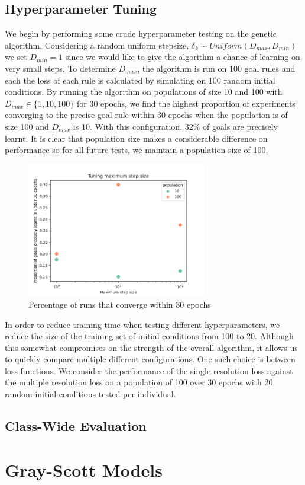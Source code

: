 \subsection{Hyperparameter Tuning}\label{sub:hyperparameter-tuning}

We begin by performing some crude hyperparameter testing on the genetic algorithm. Considering a random uniform stepsize, $\delta_k \sim \mathit{Uniform}(D_{max}, D_{min})$ we set $D_{min} = 1$ since we would like to give the algorithm a chance of learning on very small steps. To determine $D_{max}$, the algorithm is run on 100 goal rules and each the loss of each rule is calculated by simulating on 100 random initial conditions. By running the algorithm on populations of size 10 and 100 with $D_{max} \in \{1, 10, 100\}$ for 30 epochs, we find the highest proportion of experiments converging to the precise goal rule within 30 epochs when the population is of size 100 and $D_{max}$ is 10. With this configuration, 32\% of goals are precisely learnt. It is clear that population size makes a considerable difference on performance so for all future tests, we maintain a population size of 100.\\

\begin{figure}[!h]
\centering
\includegraphics[width=0.7\textwidth]{images/tune-max-step.png}
\caption{Percentage of runs that converge within 30 epochs}
\label{fig:tune-max-step}
\end{figure}

In order to reduce training time when testing different hyperparameters, we reduce the size of the training set of initial conditions from 100 to 20. Although this somewhat compromises on the strength of the overall algorithm, it allows us to quickly compare multiple different configurations. One such choice is between loss functions. We consider the performance of the single resolution loss against the multiple resolution loss on a population of 100 over 30 epochs with 20 random initial conditions tested per individual.\\    


\subsection{Class-Wide Evaluation}


\section{Gray-Scott Models}
